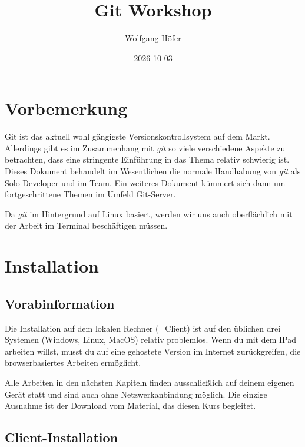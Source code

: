 \documentclass[
  ngerman,
  letterpaper,
  DIV=11]{scrreprt}
\title{Git Workshop}
\author{Wolfgang Höfer}
\date{2026-10-03}
\makeatletter
\renewcommand{\maketitle}{\bgroup\setlength{\parindent}{0pt}
\begin{flushleft}
  {\sffamily\huge\textbf{\MakeUppercase{\@title}}} \vspace{0.3cm} \newline
  {\Large {\@subtitle}} \newline
  \@author
\end{flushleft}\egroup
}
\newcommand{\git}{\textit{git}\xspace}
\makeatother
\begin{document}
\maketitle

\pagestyle{mystyle}



\chapter*{Vorbemerkung}\label{vorbemerkung}


Git ist das aktuell wohl gängigste Versionskontrollsystem auf dem Markt.
Allerdings gibt es im Zusammenhang mit \git so viele verschiedene
Aspekte zu betrachten, dass eine stringente Einführung in das Thema
relativ schwierig ist. Dieses Dokument behandelt im Wesentlichen die
normale Handhabung von \git als Solo-Developer und im Team. Ein weiteres
Dokument kümmert sich dann um fortgeschrittene Themen im Umfeld
Git-Server.

Da \git im Hintergrund auf Linux basiert, werden wir uns auch
oberflächlich mit der Arbeit im Terminal beschäftigen müssen.


\chapter{Installation}\label{installation}

\section{Vorabinformation}\label{vorabinformation}

Die Installation auf dem lokalen Rechner (=Client) ist auf den üblichen
drei Systemen (Windows, Linux, MacOS) relativ problemlos. Wenn du mit
dem IPad arbeiten willst, musst du auf eine gehostete Version im
Internet zurückgreifen, die browserbasiertes Arbeiten ermöglicht.

Alle Arbeiten in den nächsten Kapiteln finden ausschließlich auf deinem
eigenen Gerät statt und sind auch ohne Netzwerkanbindung möglich. Die
einzige Ausnahme ist der Download vom Material, das diesen Kurs
begleitet.

\section{Client-Installation}\label{client-installation}
\end{document}
